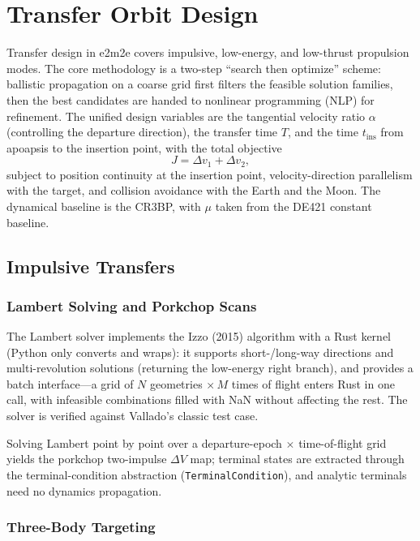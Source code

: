 \section{Transfer Orbit Design}
\label{sec:transfer}

Transfer design in e2m2e covers impulsive, low-energy, and low-thrust
propulsion modes. The core methodology is a two-step ``search then optimize''
scheme: ballistic propagation on a coarse grid first filters the feasible
solution families, then the best candidates are handed to nonlinear
programming (NLP) for refinement. The unified design variables are the
tangential velocity ratio $\alpha$ (controlling the departure direction), the
transfer time $T$, and the time $t_{\mathrm{ins}}$ from apoapsis to the
insertion point, with the total objective
\begin{equation}
  J = \Delta v_1 + \Delta v_2 ,
\end{equation}
subject to position continuity at the insertion point, velocity-direction
parallelism with the target, and collision avoidance with the Earth and the
Moon. The dynamical baseline is the CR3BP, with $\mu$ taken from the DE421
constant baseline.

\subsection{Impulsive Transfers}

\subsubsection{Lambert Solving and Porkchop Scans}

The Lambert solver implements the Izzo (2015) algorithm with a Rust kernel
(Python only converts and wraps): it supports short-/long-way directions and
multi-revolution solutions (returning the low-energy right branch), and
provides a batch interface---a grid of $N$ geometries $\times\,M$ times of
flight enters Rust in one call, with infeasible combinations filled with NaN
without affecting the rest. The solver is verified against Vallado's classic
test case.

Solving Lambert point by point over a departure-epoch $\times$ time-of-flight
grid yields the porkchop two-impulse $\Delta V$ map; terminal states are
extracted through the terminal-condition abstraction
(\texttt{TerminalCondition}), and analytic terminals need no dynamics
propagation.

\subsubsection{Three-Body Targeting}

